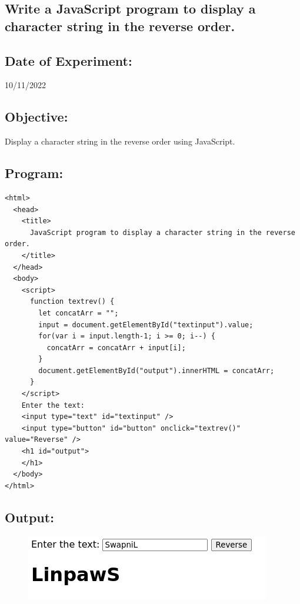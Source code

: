 \documentclass[12pt, a4paper]{article}
\begin{document}
\pagebreak

\begin{tcolorbox}
  \section{Write a JavaScript program to display a character string in the reverse order.}
\end{tcolorbox}
\subsection*{Date of Experiment:}
10/11/2022
\subsection*{Objective:}
Display a character string in the reverse order using JavaScript.

\subsection*{Program:}
\begin{lstlisting}
<html>
  <head>
    <title>
      JavaScript program to display a character string in the reverse order.
    </title>
  </head>
  <body>
    <script>
      function textrev() {
        let concatArr = "";
        input = document.getElementById("textinput").value;
        for(var i = input.length-1; i >= 0; i--) {
          concatArr = concatArr + input[i];
        }
        document.getElementById("output").innerHTML = concatArr;
      }
    </script>
    Enter the text: 
    <input type="text" id="textinput" />
    <input type="button" id="button" onclick="textrev()" value="Reverse" />
    <h1 id="output">
    </h1>
  </body>
</html>
\end{lstlisting}
\pagebreak
\subsection*{Output:}
\vskip10pt
\begin{figure}[h]
  \centering
  \includegraphics{8}
\end{figure}

\pagebreak
\end{document}

